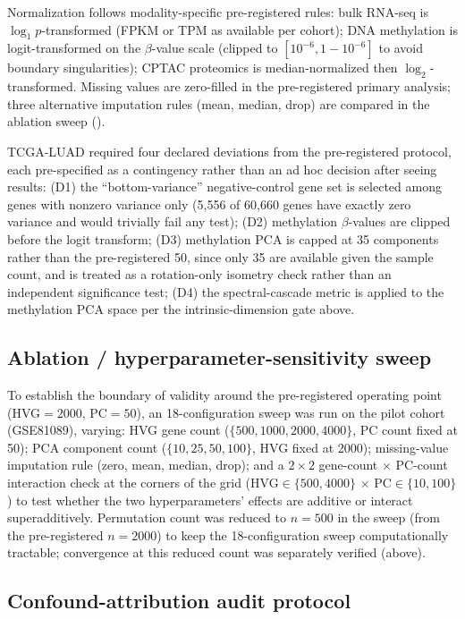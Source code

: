 Normalization follows modality-specific pre-registered rules: bulk RNA-seq is $\log_1p$-transformed (FPKM or TPM as available per cohort); DNA methylation is logit-transformed on the $\beta$-value scale (clipped to $[10^{-6}, 1-10^{-6}]$ to avoid boundary singularities); CPTAC proteomics is median-normalized then $\log_2$-transformed. Missing values are zero-filled in the pre-registered primary analysis; three alternative imputation rules (mean, median, drop) are compared in the ablation sweep ().

TCGA-LUAD required four declared deviations from the pre-registered protocol, each pre-specified as a contingency rather than an ad hoc decision after seeing results: (D1) the ``bottom-variance'' negative-control gene set is selected among genes with nonzero variance only (5{,}556 of 60{,}660 genes have exactly zero variance and would trivially fail any test); (D2) methylation $\beta$-values are clipped before the logit transform; (D3) methylation PCA is capped at 35 components rather than the pre-registered 50, since only 35 are available given the sample count, and is treated as a rotation-only isometry check rather than an independent significance test; (D4) the spectral-cascade metric is applied to the methylation PCA space per the intrinsic-dimension gate above.

\subsection{Ablation / hyperparameter-sensitivity sweep}
\label{sec:methods-ablation}

To establish the boundary of validity around the pre-registered operating point (HVG$=2000$, PC$=50$), an 18-configuration sweep was run on the pilot cohort (GSE81089), varying: HVG gene count ($\{500, 1000, 2000, 4000\}$, PC count fixed at 50); PCA component count ($\{10, 25, 50, 100\}$, HVG fixed at 2000); missing-value imputation rule (zero, mean, median, drop); and a $2\times2$ gene-count $\times$ PC-count interaction check at the corners of the grid (HVG$\in\{500,4000\}$ $\times$ PC$\in\{10,100\}$) to test whether the two hyperparameters' effects are additive or interact superadditively. Permutation count was reduced to $n=500$ in the sweep (from the pre-registered $n=2000$) to keep the 18-configuration sweep computationally tractable; convergence at this reduced count was separately verified (above).

\subsection{Confound-attribution audit protocol}
\label{sec:methods-confound}

